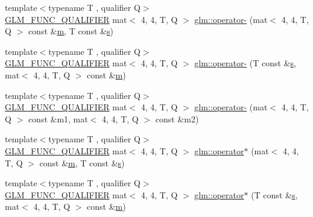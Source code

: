 \begin{DoxyCompactItemize}
\item 
{\footnotesize template$<$typename T , qualifier Q$>$ }\\\hyperlink{setup_8hpp_a33fdea6f91c5f834105f7415e2a64407}{G\+L\+M\+\_\+\+F\+U\+N\+C\+\_\+\+Q\+U\+A\+L\+I\+F\+I\+ER} mat$<$ 4, 4, T, Q $>$ \hyperlink{namespaceglm_a56afe53e1478f62c6cff6b49e8cf8977}{glm\+::operator-\/} (mat$<$ 4, 4, T, Q $>$ const \&\hyperlink{_s_d_l__opengl__glext_8h_af593500c283bf1a787a6f947f503a5c2}{m}, T const \&\hyperlink{_s_d_l__opengl_8h_a4af680a6c683f88ed67b76f207f2e6e4}{s})
\item 
{\footnotesize template$<$typename T , qualifier Q$>$ }\\\hyperlink{setup_8hpp_a33fdea6f91c5f834105f7415e2a64407}{G\+L\+M\+\_\+\+F\+U\+N\+C\+\_\+\+Q\+U\+A\+L\+I\+F\+I\+ER} mat$<$ 4, 4, T, Q $>$ \hyperlink{namespaceglm_af1c9d3364d199255b36f08ead113e1ce}{glm\+::operator-\/} (T const \&\hyperlink{_s_d_l__opengl_8h_a4af680a6c683f88ed67b76f207f2e6e4}{s}, mat$<$ 4, 4, T, Q $>$ const \&\hyperlink{_s_d_l__opengl__glext_8h_af593500c283bf1a787a6f947f503a5c2}{m})
\item 
{\footnotesize template$<$typename T , qualifier Q$>$ }\\\hyperlink{setup_8hpp_a33fdea6f91c5f834105f7415e2a64407}{G\+L\+M\+\_\+\+F\+U\+N\+C\+\_\+\+Q\+U\+A\+L\+I\+F\+I\+ER} mat$<$ 4, 4, T, Q $>$ \hyperlink{namespaceglm_a003c4a084c06d618838ca9cbd23703d3}{glm\+::operator-\/} (mat$<$ 4, 4, T, Q $>$ const \&m1, mat$<$ 4, 4, T, Q $>$ const \&m2)
\item 
{\footnotesize template$<$typename T , qualifier Q$>$ }\\\hyperlink{setup_8hpp_a33fdea6f91c5f834105f7415e2a64407}{G\+L\+M\+\_\+\+F\+U\+N\+C\+\_\+\+Q\+U\+A\+L\+I\+F\+I\+ER} mat$<$ 4, 4, T, Q $>$ \hyperlink{namespaceglm_a5c0a2f1c927fa82395e818d38dda40af}{glm\+::operator$\ast$} (mat$<$ 4, 4, T, Q $>$ const \&\hyperlink{_s_d_l__opengl__glext_8h_af593500c283bf1a787a6f947f503a5c2}{m}, T const \&\hyperlink{_s_d_l__opengl_8h_a4af680a6c683f88ed67b76f207f2e6e4}{s})
\item 
{\footnotesize template$<$typename T , qualifier Q$>$ }\\\hyperlink{setup_8hpp_a33fdea6f91c5f834105f7415e2a64407}{G\+L\+M\+\_\+\+F\+U\+N\+C\+\_\+\+Q\+U\+A\+L\+I\+F\+I\+ER} mat$<$ 4, 4, T, Q $>$ \hyperlink{namespaceglm_a5e8439deb5e4bd729665a6f3babb10fe}{glm\+::operator$\ast$} (T const \&\hyperlink{_s_d_l__opengl_8h_a4af680a6c683f88ed67b76f207f2e6e4}{s}, mat$<$ 4, 4, T, Q $>$ const \&\hyperlink{_s_d_l__opengl__glext_8h_af593500c283bf1a787a6f947f503a5c2}{m})

\end{DoxyCompactItemize}
